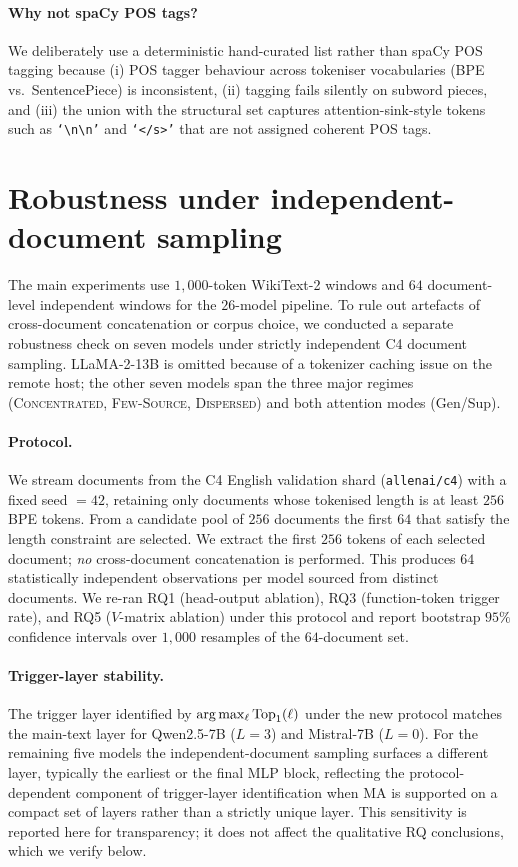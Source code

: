 \paragraph{Why not spaCy POS tags?}
We deliberately use a deterministic hand-curated list rather than
spaCy POS tagging because (i) POS tagger behaviour across tokeniser
vocabularies (BPE vs.\ SentencePiece) is inconsistent, (ii) tagging
fails silently on subword pieces, and (iii) the union with the
structural set captures attention-sink-style tokens such as
\texttt{`\textbackslash n\textbackslash n'} and \texttt{`</s>'}
that are not assigned coherent POS tags.

\section{Robustness under independent-document sampling}
\label{app:per-doc}

The main experiments use $1{,}000$-token WikiText-2 windows and $64$
document-level independent windows for the $26$-model pipeline. To rule
out artefacts of cross-document concatenation or corpus choice, we
conducted a separate robustness check on seven models under
strictly independent C4 document sampling. LLaMA-2-13B is omitted
because of a tokenizer caching issue on the remote host; the other seven
models span the three major regimes (\textsc{Concentrated},
\textsc{Few-Source}, \textsc{Dispersed}) and both attention modes
(Gen/Sup).

\paragraph{Protocol.}
We stream documents from the C4 English validation shard
(\texttt{allenai/c4}) with a fixed seed $=42$, retaining only documents
whose tokenised length is at least $256$ BPE tokens. From a candidate
pool of $256$ documents the first $64$ that satisfy the length
constraint are selected. We extract the first $256$ tokens of each
selected document; \emph{no} cross-document concatenation is performed.
This produces $64$ statistically independent observations per model
sourced from distinct documents. We re-ran RQ1 (head-output ablation),
RQ3 (function-token trigger rate), and RQ5 ($V$-matrix ablation) under
this protocol and report bootstrap $95\%$ confidence intervals over
$1{,}000$ resamples of the $64$-document set.

\paragraph{Trigger-layer stability.}
The trigger layer identified by $\arg\max_{\ell} \mathrm{Top}_1(\ell)$ under
the new protocol matches the main-text layer for Qwen2.5-7B ($L{=}3$)
and Mistral-7B ($L{=}0$). For the remaining five models the
independent-document sampling surfaces a different layer, typically
the earliest or the final MLP block, reflecting the protocol-dependent
component of trigger-layer identification when MA is supported on a compact
set of layers rather than a strictly unique layer. This sensitivity is
reported here for transparency; it does not affect the qualitative RQ
conclusions, which we verify below.

